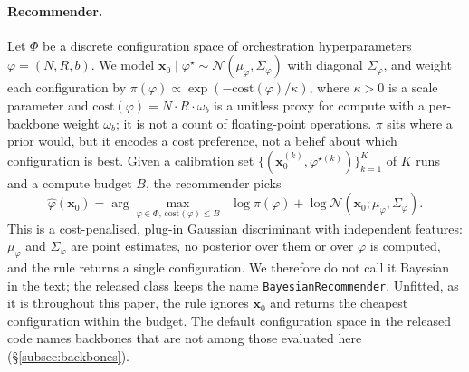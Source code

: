 \documentclass[10pt,a4paper]{article}
\begin{document}
\paragraph{Recommender.} Let $\Phi$ be a discrete configuration
space of orchestration hyperparameters
$\varphi = (N, R, b)$. We model
$\mathbf{x}_0 \mid \varphi^\star \sim \mathcal{N}(\mu_\varphi,
\Sigma_\varphi)$ with diagonal $\Sigma_\varphi$, and weight each configuration by
$\pi(\varphi) \propto \exp(-\mathrm{cost}(\varphi) / \kappa)$, where $\kappa>0$
is a scale parameter and
$\mathrm{cost}(\varphi) = N \cdot R \cdot \omega_b$ is a unitless proxy for compute
with a per-backbone weight $\omega_b$; it is not a count of floating-point
operations. $\pi$ sits where a prior would, but it encodes a cost preference, not
a belief about which configuration is best. Given a calibration set
$\{(\mathbf{x}_0^{(k)}, \varphi^{\star(k)})\}_{k=1}^K$ of $K$ runs and a compute
budget $B$, the recommender picks
\begin{equation}
  \widehat\varphi(\mathbf{x}_0) = \arg\max_{\varphi \in \Phi,\, \mathrm{cost}(\varphi) \leq B}
  \;\; \log \pi(\varphi) + \log \mathcal{N}(\mathbf{x}_0; \mu_\varphi, \Sigma_\varphi).
\end{equation}
This is a cost-penalised, plug-in Gaussian discriminant with independent features:
$\mu_\varphi$ and $\Sigma_\varphi$ are point estimates, no posterior over them or
over $\varphi$ is computed, and the rule returns a single configuration. We
therefore do not call it Bayesian in the text; the released class keeps the name
\texttt{BayesianRecommender}. Unfitted, as it is throughout this paper, the rule
ignores $\mathbf{x}_0$ and returns the cheapest configuration within the budget.
The default configuration space in the released code names backbones that are
not among those evaluated here (\S\ref{subsec:backbones}).

\begin{center}
\end{center}
\end{document}
